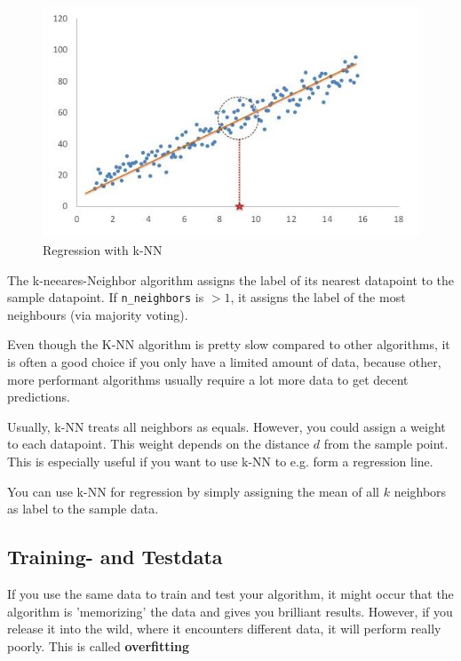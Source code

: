 \documentclass[11pt]{article}
\newcommand{\code}[1]{\texttt{#1}}
\begin{document}
\vspace{10px}

\begin{figure}
    \centering
    \includegraphics[keepaspectratio=true,height=12\baselineskip]{k-nn-regression.jpg}
    \caption{Regression with k-NN}
    \label{fig:knn-regression}
\end{figure}

The k-neeares-Neighbor algorithm assigns the label of its nearest datapoint to the sample datapoint. If \code{n\_neighbors} is $>1$, it assigns the label of the most neighbours (via majority voting).

\vspace{10px}

Even though the K-NN algorithm is pretty slow compared to other algorithms, it is often a good choice if you only have a limited amount of data, because other, more performant algorithms usually require a lot more data to get decent predictions.

Usually, k-NN treats all neighbors as equals. However, you could assign a weight to each datapoint. This weight depends on the distance $d$ from the sample point. This is especially useful if you want to use k-NN to e.g. form a regression line.

You can use k-NN for regression by simply assigning the mean of all $k$ neighbors as label to the sample data.

\subsection{Training- and Testdata}
If you use the same data to train and test your algorithm, it might occur that the algorithm is 'memorizing' the data and gives you brilliant results. However, if you release it into the wild, where it encounters different data, it will perform really poorly. This is called \textbf{overfitting}
\end{document}
